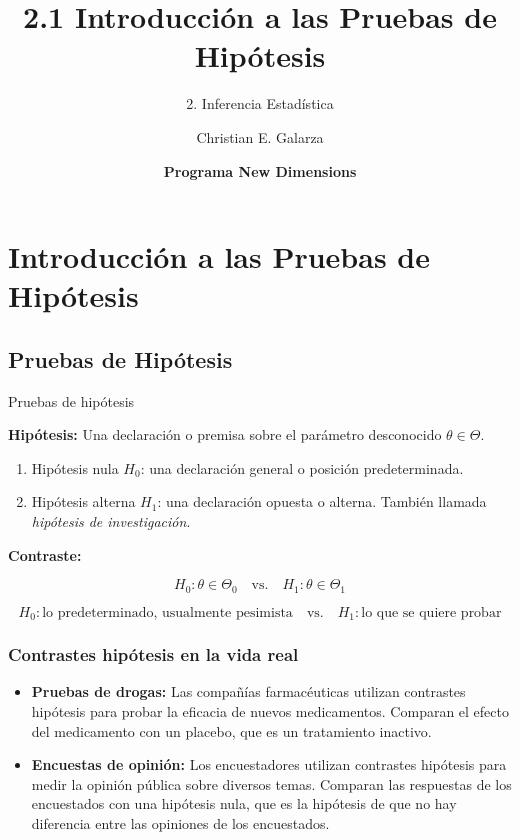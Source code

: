 \documentclass[aspectratio=169]{beamer}
\title[2.1 Introducción a las Pruebas de Hipótesis]{\Huge 2.1 Introducción a las Pruebas de Hipótesis}
\subtitle{2. Inferencia Estadística}
\author{Christian E. Galarza}
\date{\bf Programa New Dimensions}
\begin{document}
\frame{\titlepage}

\section{Introducción a las Pruebas de Hipótesis}

\subsection{Pruebas de Hipótesis}



\begin{frame}{Pruebas de hipótesis}

{\bf Hipótesis:} Una declaración o premisa sobre el parámetro desconocido \( \theta \in \Theta \).

\vfill

    \begin{enumerate}
        \item Hipótesis nula \( H_0 \): una declaración general o posición predeterminada.
        \item Hipótesis alterna \( H_1 \): una declaración opuesta o alterna. También llamada {\em hipótesis de investigación}.
    \end{enumerate}

\vfill
    
    {\bf Contraste:}
    
    \[ H_0: \theta \in \Theta_0  \quad \text{vs.} \quad  H_1: \theta \in \Theta_1 \]

     \[ H_0: \text{lo predeterminado, usualmente pesimista}  \quad \text{vs.} \quad  H_1: \text{lo que se quiere probar} \]
\end{frame}





\begin{frame}

\frametitle{Contrastes hipótesis en la vida real}

\begin{itemize}

\item {\bf Pruebas de drogas:} Las compañías farmacéuticas utilizan contrastes hipótesis para probar la eficacia de nuevos medicamentos. Comparan el efecto del medicamento con un placebo, que es un tratamiento inactivo.

\item {\bf Encuestas de opinión:} Los encuestadores utilizan contrastes hipótesis para medir la opinión pública sobre diversos temas. Comparan las respuestas de los encuestados con una hipótesis nula, que es la hipótesis de que no hay diferencia entre las opiniones de los encuestados.

\end{itemize}

\end{frame}
\end{document}
